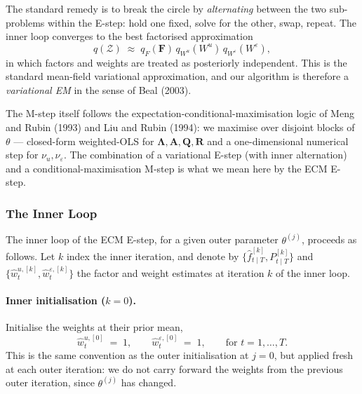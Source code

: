 \documentclass[11pt, a4paper, oneside]{article}
\newcommand{\mF}{\mathbf{F}}
\newcommand{\mL}{\boldsymbol{\Lambda}}
\newcommand{\mA}{\mathbf{A}}
\newcommand{\mR}{\mathbf{R}}
\newcommand{\mQ}{\mathbf{Q}}
\begin{document}
The standard remedy is to break the circle by \emph{alternating}
between the two sub-problems within the E-step: hold one fixed,
solve for the other, swap, repeat. The inner loop converges to the
best factorised approximation
\[
q(\mathcal{Z}) \;\approx\; q_F(\mF)\, q_{W^u}(W^u)\, q_{W^\varepsilon}(W^\varepsilon),
\]
in which factors and weights are treated as posteriorly independent.
This is the standard mean-field variational approximation, and our
algorithm is therefore a \emph{variational EM} in the sense of
Beal (2003).

The M-step itself follows the expectation-conditional-maximisation
logic of Meng and Rubin (1993) and Liu and Rubin (1994): we maximise
over disjoint blocks of $\theta$ — closed-form weighted-OLS for $\mL,
\mA, \mQ, \mR$ and a one-dimensional numerical step for $\nu_u,
\nu_\varepsilon$. The combination of a variational E-step (with
inner alternation) and a conditional-maximisation M-step is what we
mean here by the ECM E-step.

\subsubsection{The Inner Loop}

The inner loop of the ECM E-step, for a given outer parameter
$\theta^{(j)}$, proceeds as follows. Let $k$ index the inner
iteration, and denote by $\{\hat{f}_{t \mid T}^{[k]}, P_{t \mid T}^{[k]}\}$
and $\{\hat{w}^{u,[k]}_t, \hat{w}^{\varepsilon,[k]}_t\}$ the factor
and weight estimates at iteration $k$ of the inner loop.

\paragraph{Inner initialisation ($k = 0$).}
Initialise the weights at their prior mean,
\[
\hat{w}^{u,[0]}_t \;=\; 1, \qquad \hat{w}^{\varepsilon,[0]}_t \;=\; 1,
\qquad \text{for } t = 1, \ldots, T.
\]
This is the same convention as the outer initialisation at $j = 0$,
but applied fresh at each outer iteration: we do not carry forward the
weights from the previous outer iteration, since $\theta^{(j)}$ has
changed.
\end{document}
